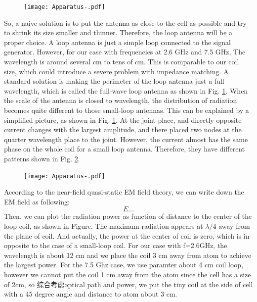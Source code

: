 \begin{figure}[htb]
\begin{center}
\texttt{[image: Apparatus-.pdf]}
\end{center}
\caption[]{}  
\label{Apparatus_full_antenna}
\end{figure}

So, a naive solution is to put the antenna as close to the cell as possible and try to shrink its size smaller and thinner. Therefore, the loop antenna will be a proper choice. A loop antenna is just a simple loop connected to the signal generator. However, for our case with frequencies at 2.6 GHz and 7.5 GHz, The wavelength is around several cm to tens of cm. This is comparable to our coil size, which could introduce a severe problem with impedance matching. A standard solution is making the perimeter of the loop antenna just a full wavelength, which is called the full-wave loop antenna as shown in Fig. \ref{Apparatus_full_antenna}. When the scale of the antenna is closed to wavelength, the distribution of radiation becomes quite different to those small-loop antennas. This can be explained by a simplified picture, as shown in Fig. \ref{Apparatus_full_antenna}. At the joint place, and directly opposite current changes with the largest amplitude, and there placed two nodes at the quarter wavelength place to the joint. However, the current almost has the same phase on the whole coil for a small loop antenna. Therefore, they have different patterns shown in Fig. \ref{Apparatus_antenna_full_small}.

\begin{figure}[htb]
\begin{center}
\texttt{[image: Apparatus-.pdf]}
\end{center}
\caption[]{}  
\label{Apparatus_antenna_full_small}
\end{figure}

According to the near-field quasi-static EM field theory, we can write down the EM field as following:
\begin{equation}
    E...
\end{equation}
Then, we can plot the radiation power as function of distance to the center of the loop coil, as shown in Figure. The maximum radiation appears at \(\lambda/4\) away from the plane of coil. And actually, the power at the center of coil is zero, which is in opposite to the case of a small-loop coil. For our case with f=2.6GHz, the wavelength is about 12 cm and we place the coil 3 cm away from atom to achieve the largest power. For the 7.5 Ghz case, we use paramter about 4 cm coil loop, however we cannot put the coil 1 cm away from the atom since the cell has a size of 2cm, so 综合考虑optical path and power, we put the tiny coil at the side of cell with a 45 degree angle and distance to atom about 3 cm. 


